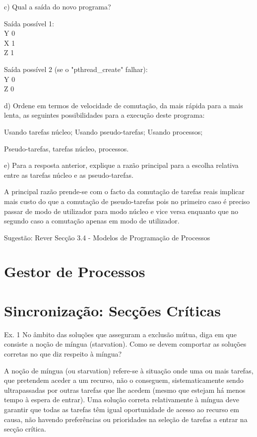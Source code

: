 \documentclass[11pt]{article}
\begin{document}
c) Qual a saída do novo programa?

Saída possível 1: \\
Y 0 \\
X 1 \\
Z 1

Saída possível 2 (se o "pthread\_create" falhar): \\
Y 0 \\
Z 0

d) Ordene em termos de velocidade de comutação, da mais rápida para a mais lenta, as seguintes possibilidades para a execução deste programa:

Usando tarefas núcleo;
Usando pseudo-tarefas;
Usando processos;

Pseudo-tarefas, tarefas núcleo, processos.

e) Para a resposta anterior, explique a razão principal para a escolha relativa entre as tarefas núcleo e as pseudo-tarefas.

A principal razão prende-se com o facto da comutação de tarefas reais implicar mais custo do que a comutação de pseudo-tarefas pois no primeiro caso é preciso passar de modo de utilizador para modo núcleo e vice versa enquanto que no segundo caso a comutação apenas em modo de utilizador.

Sugestão: Rever Secção 3.4 - Modelos de Programação de Processos

\newpage

\section{Gestor de Processos}

\newpage

\section{Sincronização: Secções Críticas}

Ex. 1 No âmbito das soluções que asseguram a exclusão mútua, diga em que consiste a noção de míngua (starvation). Como se devem comportar as soluções corretas no que diz respeito à míngua?

A noção de míngua (ou starvation) refere-se à situação onde uma ou mais tarefas, que pretendem aceder a um recurso, não o conseguem, sistematicamente sendo ultrapassadas por outras tarefas que lhe acedem (mesmo que estejam há menos tempo à espera de entrar). Uma solução correta relativamente à míngua deve garantir que todas as tarefas têm igual oportunidade de acesso ao recurso em causa, não havendo preferências ou prioridades na seleção de tarefas a entrar na secção crítica.
\end{document}
